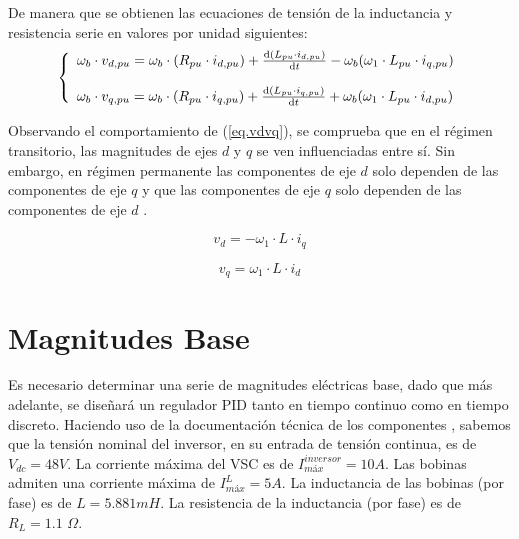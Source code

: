 \documentclass{report}
\begin{document}
De manera que se obtienen las ecuaciones de tensión de la inductancia y resistencia serie en valores por unidad siguientes:
\begin{equation}
    \left\{\begin{array}{l}
    \omega_b \cdot v_{d,pu} = \omega_b \cdot (R_{pu} \cdot i_{d,pu}) + \frac{\mathrm{d}({L_{pu} \cdot i_{d,pu}})}{\mathrm{d} t} - \omega_b (\omega_{1} \cdot L_{pu} \cdot i_{q,pu})
    \\
    \null \\
    \omega_b \cdot v_{q,pu} = \omega_b \cdot (R_{pu} \cdot i_{q,pu}) + \frac{\mathrm{d}({L_{pu} \cdot i_{q,pu}})}{\mathrm{d} t} + \omega_b (\omega_{1} \cdot L_{pu} \cdot i_{d,pu})
    \end{array} \right. \label{eq.vdvqpu} 
\end{equation}


Observando el comportamiento de (\ref{eq.vdvq}), se comprueba que en el régimen transitorio, las magnitudes de ejes $d$ y $q$ se ven influenciadas entre sí. Sin embargo, en régimen permanente las componentes de eje $d$ solo dependen de las componentes de eje $q$ y que las componentes de eje $q$ solo dependen de las componentes de eje $d$ \cite{cuarentaytres}.

\begin{equation}
    v_{d} = - \omega_{1} \cdot L \cdot i_{q} \label{eq.vdsimplificadaregimenpermanente} 
\end{equation}

\begin{equation}
    v_{q} =\omega_{1} \cdot  L \cdot i_{d} \label{eq.vqsimplificadaregimenpermanente} 
\end{equation}


\section{Magnitudes Base} \label{sec.magnitudesbase}

Es necesario determinar una serie de magnitudes eléctricas base, dado que más adelante, se diseñará un regulador PID tanto en tiempo continuo como en tiempo discreto. Haciendo uso de la documentación técnica de los componentes \cite{diecisiete}, sabemos que la tensión nominal del inversor, en su entrada de tensión continua, es de $V_{dc} = 48V$. La corriente máxima del VSC es de $I_{máx}^{inversor} = 10A$. Las bobinas admiten una corriente máxima de $I_{máx}^{L} = 5A$. La inductancia de las bobinas (por fase) es de $L = 5.881mH$. La resistencia de la inductancia (por fase) es de $R_{L} = 1.1$ $\Omega$.
\end{document}
